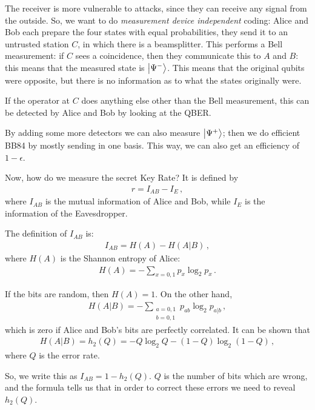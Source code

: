 \documentclass[main.tex]{subfiles}
\begin{document}
The receiver is more vulnerable to attacks, since they can receive any signal from the outside. 
So, we want to do \emph{measurement device independent} coding: Alice and Bob each prepare the four states with equal probabilities, they send it to an untrusted station \(C\), in which there is a beamsplitter. 
This performs a Bell measurement: if \(C\) sees a coincidence, then they communicate this to \(A\) and \(B\): this means that the measured state is \(\ket{\Psi^{-}}\). This means that the original qubits were opposite, but there is no information as to what the states originally were. 

If the operator at \(C\) does anything else other than the Bell measurement, this can be detected by Alice and Bob by looking at the QBER. 

By adding some more detectors we can also measure \(\ket{\Psi^{+}}\); then we do efficient BB84 by mostly sending in one basis. 
This way, we can also get an efficiency of \(1- \epsilon \). 

Now, how do we measure the secret Key Rate? 
It is defined by 
%
\begin{align}
r = I_{AB} - I_E 
\,,
\end{align}
%
where \(I_{AB}\) is the mutual information of Alice and Bob, while \(I_E\) is the information of the Eavesdropper. 

The definition of \(I_{AB}\) is: 
%
\begin{align}
I_{AB} = H(A) - H(A|B)
\,,
\end{align}
%
where \(H(A)\) is the Shannon entropy of Alice: 
%
\begin{align}
H(A) = - \sum_{x = 0,1} p_x \log_2  p_x
\,.
\end{align}

If the bits are random, then \(H(A )= 1\). On the other hand, 
%
\begin{align}
H(A|B) = - \sum _{\substack{a=0,1 \\ b=0,1} } p_{ab} \log_2 p_{a|b}
\,,
\end{align}
%
which is zero if Alice and Bob's bits are perfectly correlated. It can be shown that 
%
\begin{align}
H(A|B) = h_2  (Q) = -Q \log_2 Q - (1-Q) \log_2 (1-Q)
\,,
\end{align}
%
where \(Q\) is the error rate. 

So, we write this as \(I_{AB} = 1 - h_2 (Q)\). 
\(Q\) is the number of bits which are wrong, and the formula tells us that in order to correct these errors we need to reveal \(h_2 (Q)\). 
\end{document}
